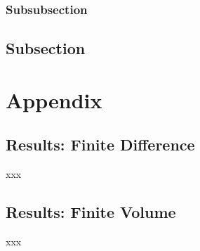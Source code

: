 \documentclass[fleqn,10pt]{SelfArx} %
\begin{document}
\subsubsection{Subsubsection}

\lipsum[9] %

\subsection{Subsection}

\lipsum[10] %


\section{Appendix}

\subsection{Results: Finite Difference}

xxx

\subsection{Results: Finite Volume}

xxx





\end{document}
